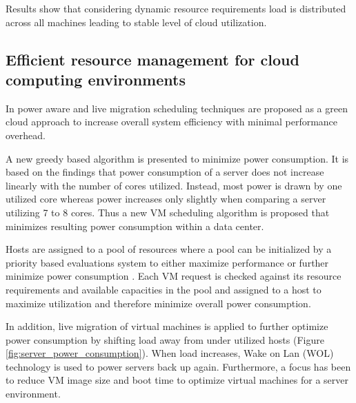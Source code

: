 Results show that considering dynamic resource requirements load is distributed across all machines leading to stable level of cloud utilization. 



\subsection{Efficient resource management for cloud computing environments}

In \cite{younge2010efficient} power aware and live migration scheduling techniques are proposed as a green cloud approach to increase overall system efficiency with minimal performance overhead. 

A new greedy based algorithm is presented to minimize power consumption. It is based on the findings that power consumption of a server does not increase linearly with the number of cores utilized. Instead, most power is drawn by one utilized core whereas power increases only slightly when comparing a server utilizing 7 to 8 cores. Thus a new VM scheduling algorithm is proposed that minimizes resulting power consumption within a data center. 

Hosts are assigned to a pool of resources where a pool can be initialized by a priority based evaluations system to either maximize performance or further minimize power consumption \cite{younge2010efficient}. Each VM request is checked against its resource requirements and available capacities in the pool and assigned to a host to maximize utilization and therefore minimize overall power consumption. 

In addition, live migration of virtual machines is applied to further optimize power consumption by shifting load away from under utilized hosts (Figure \ref{fig:server_power_consumption}). When load increases, Wake on Lan (WOL) technology is used to power servers back up again. Furthermore, a focus has been to reduce VM image size and boot time to optimize virtual machines for a server environment. 


